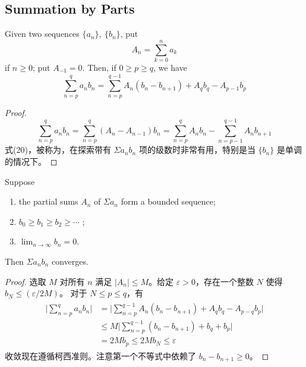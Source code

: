 \documentclass[../poma-notes.tex]{subfiles}
\begin{document}
\subsection*{Summation by Parts}

\begin{theorem}
  Given two sequences $\{a_n\},\ \{b_n\}$, put
  \[ A_n = \sum_{k=0}^{n} a_k \]
  if $n \ge 0$; put $A_{-1} = 0$. Then, if $0 \ge p \ge q$, we have
  \begin{equation}
    \sum_{n=p}^{q} a_n b_n = \sum_{n=p}^{q-1} A_n(b_n-b_{n+1}) + A_q b_q - A_{p-1}b_p
  \end{equation}
\end{theorem}

\begin{proof}
  \[
    \sum_{n=p}^{q} a_n b_n = \sum_{n=p}^{q}(A_n - A_{n-1})b_n = \sum_{n=p}^{q} A_n b_n - \sum_{n=p-1}^{q-1}A_n b_{n+1}
  \]
  式(20)，被称为，在探索带有 $\Sigma a_n b_n$ 项的级数时非常有用，特别是当 $\{b_n\}$
  是单调的情况下。
\end{proof}

\begin{theorem}
  Suppose
  \begin{enumerate}[label=(\alph*)]
    \item the partial sums $A_n$ of $\Sigma a_n$ form a bounded sequence;
    \item $b_0 \ge b_1 \ge b_2 \ge \cdots$ ;
    \item $\lim_{n\to\infty} b_n = 0$.
  \end{enumerate}
  Then $\Sigma a_n b_n$ converges.
\end{theorem}

\begin{proof}
  选取 $M$ 对所有 $n$ 满足 $|A_n| \le M$。给定 $\varepsilon > 0$，存在一个整数 $N$ 使得 $b_N \le (\varepsilon/2M)$。
  对于 $N \le p \le q$，有
  \begin{align*}
    \begin{split}
      \Biggl|\sum_{n=p}^{q} a_n b_n\Biggr| & = \Biggl|\sum_{n=p}^{q-1} A_n(b_n - b_{n+1}) + A_q b_q - A_{p-q} b_p\Biggr| \\
      & \le M \Biggl|\sum_{n=p}^{q-1}(b_n-b_{n+1}) + b_q + b_p\Biggr| \\
      & = 2M b_p \le 2M b_N \le \varepsilon
    \end{split}
  \end{align*}
  收敛现在遵循柯西准则。注意第一个不等式中依赖了 $b_n - b_{n+1} \ge 0$。
\end{proof}
\end{document}
